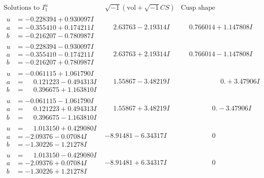 \documentclass[1p]{elsarticle_modified}
\theoremstyle{definition}
\newcommand{\I}{\sqrt{-1}}
\begin{document}
$$\begin{array}{c|c|c}  
\text{Solutions to }I^u_{1}& \I (\text{vol} + \sqrt{-1}CS) & \text{Cusp shape}\\
 \hline 
\begin{aligned}
u &= -0.228394 + 0.930097 I \\
a &= -0.355410 + 0.174211 I \\
b &= -0.216207 - 0.780987 I\end{aligned}
 & \phantom{-}2.63763 - 2.19314 I & \phantom{-}0.766014 + 1.147808 I \\ \hline\begin{aligned}
u &= -0.228394 - 0.930097 I \\
a &= -0.355410 - 0.174211 I \\
b &= -0.216207 + 0.780987 I\end{aligned}
 & \phantom{-}2.63763 + 2.19314 I & \phantom{-}0.766014 - 1.147808 I \\ \hline\begin{aligned}
u &= -0.061115 + 1.061790 I \\
a &= \phantom{-}0.121223 - 0.494313 I \\
b &= \phantom{-}0.396675 + 1.163810 I\end{aligned}
 & \phantom{-}1.55867 - 3.48219 I & \phantom{-0.000000 -}0. + 3.47906 I \\ \hline\begin{aligned}
u &= -0.061115 - 1.061790 I \\
a &= \phantom{-}0.121223 + 0.494313 I \\
b &= \phantom{-}0.396675 - 1.163810 I\end{aligned}
 & \phantom{-}1.55867 + 3.48219 I & \phantom{-0.000000 } 0. - 3.47906 I \\ \hline\begin{aligned}
u &= \phantom{-}1.013150 + 0.429080 I \\
a &= -2.09376 - 0.07084 I \\
b &= -1.30226 - 1.21278 I\end{aligned}
 & -8.91481 - 6.34317 I & \phantom{-0.000000 } 0 \\ \hline\begin{aligned}
u &= \phantom{-}1.013150 - 0.429080 I \\
a &= -2.09376 + 0.07084 I \\
b &= -1.30226 + 1.21278 I\end{aligned}
 & -8.91481 + 6.34317 I & \phantom{-0.000000 } 0 \\ \hline\begin{aligned}

\end{aligned}
\end{array}$$
\end{document}
